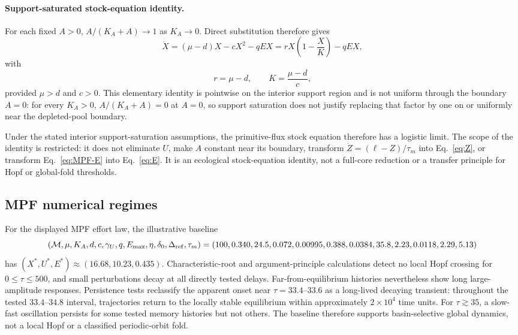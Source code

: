 \documentclass[11pt]{article}
\begin{document}
\paragraph{Support-saturated stock-equation identity.}
For each fixed $A>0$, $A/(K_A+A)\to1$ as $K_A\to0$. Direct substitution therefore gives
\begin{equation}
\dot X=(\mu-d)X-cX^2-qEX
=rX\left(1-\frac{X}{K}\right)-qEX,
\label{eq:loglimit}
\end{equation}
with
\[
r=\mu-d,
\qquad
K=\frac{\mu-d}{c},
\]
provided $\mu>d$ and $c>0$. This elementary identity is pointwise on the interior support region and is not uniform through the boundary $A=0$: for every $K_A>0$, $A/(K_A+A)=0$ at $A=0$, so support saturation does not justify replacing that factor by one on or uniformly near the depleted-pool boundary.

Under the stated interior support-saturation assumptions, the primitive-flux stock equation therefore has a logistic limit. The scope of the identity is restricted: it does not eliminate $U$, make $A$ constant near its boundary, transform $\dot Z=(\ell-Z)/\tau_m$ into Eq.~\eqref{eq:Z}, or transform Eq.~\eqref{eq:MPF-E} into Eq.~\eqref{eq:E}. It is an ecological stock-equation identity, not a full-core reduction or a transfer principle for Hopf or global-fold thresholds.

\subsection{MPF numerical regimes}

For the displayed MPF effort law, the illustrative baseline
\[
(\mathcal M,\mu,K_A,d,c,\gamma_U,q,E_{\max},\eta,\delta_0,
\Delta_{\rm ref},\tau_m)
=(100,0.340,24.5,0.072,0.00995,0.388,0.0384,35.8,
2.23,0.0118,2.29,5.13)
\]
has $(X^*,U^*,E^*)\approx(16.68,10.23,0.435)$. Characteristic-root and argument-principle calculations detect no local Hopf crossing for $0\le\tau\le500$, and small perturbations decay at all directly tested delays. Far-from-equilibrium histories nevertheless show long large-amplitude responses. Persistence tests reclassify the apparent onset near $\tau=33.4$--$33.6$ as a long-lived decaying transient: throughout the tested $33.4$--$34.8$ interval, trajectories return to the locally stable equilibrium within approximately $2\times10^4$ time units. For $\tau\gtrsim35$, a slow-fast oscillation persists for some tested memory histories but not others. The baseline therefore supports basin-selective global dynamics, not a local Hopf or a classified periodic-orbit fold.
\end{document}
